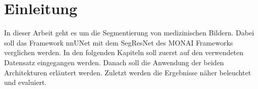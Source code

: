 \chapter{Einleitung}
In dieser Arbeit geht es um die Segmentierung von medizinischen Bildern. Dabei soll das Framework nnUNet mit dem SegResNet des MONAI Frameworks verglichen werden. In den folgenden Kapiteln soll zuerst auf den verwendeten Datensatz eingegangen werden. Danach soll die Anwendung der beiden Architekturen erläutert werden. Zuletzt werden die Ergebnisse näher beleuchtet und evaluiert.